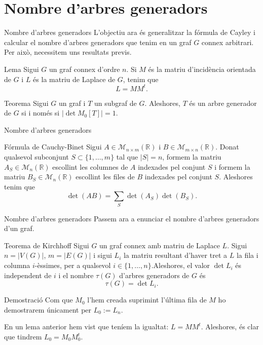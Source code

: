 \documentclass{beamer}
\begin{document}
\section{Nombre d'arbres generadors}
\begin{frame}{Nombre d'arbres generadors}
    L'objectiu ara és generalitzar la fórmula de Cayley i calcular el nombre d'arbres generadors que tenim en un graf $G$ connex arbitrari. Per això, necessitem uns resultats previs.
    \pause
    \begin{block}{Lema}
        Sigui $G$ un graf connex d'ordre $n$. Si $M$ és la matriu d'incidència orientada de $G$ i $L$ és la matriu de Laplace de $G$, tenim que $$L=MM^t.$$
    \end{block}\pause
    \begin{alertblock}{Teorema}
        Sigui $G$ un graf i $T$ un subgraf de $G$. Aleshores, $T$ és un arbre generador de $G$ si i només si $|\det M_0[T]|=1$.
    \end{alertblock}
\end{frame}
\begin{frame}{Nombre d'arbres generadors}
    \begin{alertblock}{Fórmula de Cauchy-Binet}
        Sigui $A\in\mathcal{M}_{n\times m}(\mathbb{R})$ i $B\in\mathcal{M}_{m\times n}(\mathbb{R})$. Donat qualsevol subconjunt $S\subset\{1,\ldots,m\}$ tal que $|S|=n$, formem la matriu $A_S\in\mathcal{M}_n(\mathbb{R})$ escollint les columnes de $A$ indexades pel conjunt $S$ i formem la matriu $B_S\in\mathcal{M}_n(\mathbb{R})$ escollint les files de $B$ indexades pel conjunt $S$. Aleshores tenim que $$\det(AB)=\sum_S\det(A_S)\det(B_S).$$
    \end{alertblock}
\end{frame}
\begin{frame}{Nombre d'arbres generadors}
    Passem ara a enunciar el nombre d'arbres generadors d'un graf.\pause
    \begin{alertblock}{Teorema de Kirchhoff}
        Sigui $G$ un graf connex amb matriu de Laplace $L$. Sigui $n=|V(G)|$, $m=|E(G)|$ i sigui $L_i$ la matriu resultant d'haver tret a $L$ la fila i columna $i$-èssimes, per a qualsevol $i\in\{1,\ldots,n\}$.\pause\space Aleshores, el valor $\det L_i$ és independent de $i$ i el nombre $\tau(G)$ d'arbres generadors de $G$ és $$\tau(G)=\det L_i.$$
    \end{alertblock}\pause
    \begin{block}{Demostració}
        Com que $M_0$ l'hem creada suprimint l'última fila de $M$ ho demostrarem únicament per $L_0:=L_n$.\pause\par En un lema anterior hem vist que teníem la igualtat: $L=MM^t$. Aleshores, és clar que tindrem $L_0=M_0M_0^t$.
    \end{block}
\end{frame}
\end{document}

